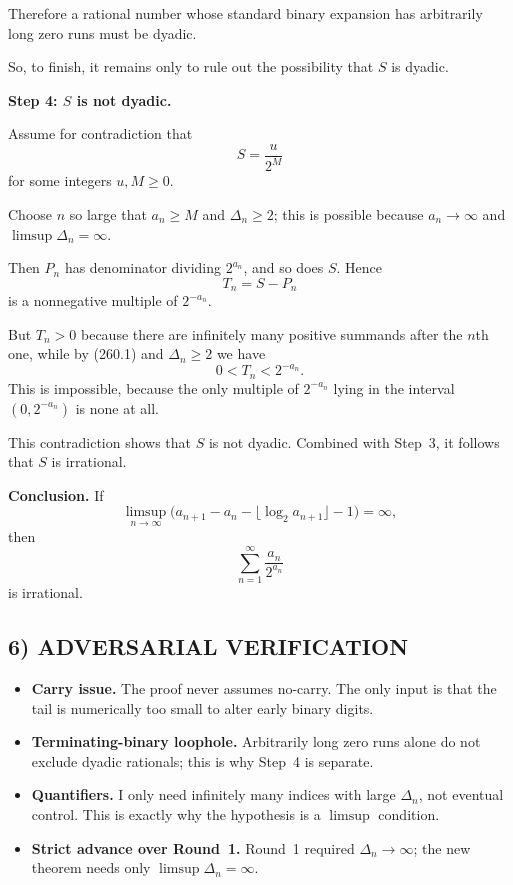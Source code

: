 Therefore a rational number whose standard binary expansion has arbitrarily long zero runs must be dyadic.

So, to finish, it remains only to rule out the possibility that $S$ is dyadic.

\medskip
\noindent
\textbf{Step 4: $S$ is not dyadic.}

Assume for contradiction that
\[
S=\frac{u}{2^M}
\]
for some integers $u,M\geq 0$.

Choose $n$ so large that $a_n\geq M$ and $\Delta_n\geq 2$; this is possible because $a_n\to\infty$ and $\limsup \Delta_n=\infty$.

Then $P_n$ has denominator dividing $2^{a_n}$, and so does $S$.  Hence
\[
T_n=S-P_n
\]
is a nonnegative multiple of $2^{-a_n}$.

But $T_n>0$ because there are infinitely many positive summands after the $n$th one, while by (260.1) and $\Delta_n\geq 2$ we have
\[
0<T_n<2^{-a_n}.
\]
This is impossible, because the only multiple of $2^{-a_n}$ lying in the interval $(0,2^{-a_n})$ is none at all.

This contradiction shows that $S$ is not dyadic.  Combined with Step~3, it follows that $S$ is irrational.

\medskip
\noindent
\textbf{Conclusion.}
If
\[
\limsup_{n\to\infty}\bigl(a_{n+1}-a_n-\lfloor \log_2 a_{n+1}\rfloor-1\bigr)=\infty,
\]
then
\[
\sum_{n=1}^{\infty}\frac{a_n}{2^{a_n}}
\]
is irrational.

\subsection*{6) ADVERSARIAL VERIFICATION}

\begin{itemize}
\item \textbf{Carry issue.}  The proof never assumes no-carry.  The only input is that the tail is numerically too small to alter early binary digits.
\item \textbf{Terminating-binary loophole.}  Arbitrarily long zero runs alone do not exclude dyadic rationals; this is why Step~4 is separate.
\item \textbf{Quantifiers.}  I only need infinitely many indices with large $\Delta_n$, not eventual control.  This is exactly why the hypothesis is a $\limsup$ condition.
\item \textbf{Strict advance over Round~1.}  Round~1 required $\Delta_n\to\infty$; the new theorem needs only $\limsup \Delta_n=\infty$.
\end{itemize}

